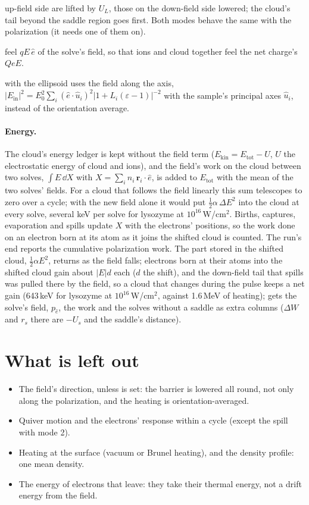 \begin{description}
    up-field side are lifted by $U_L$, those on the down-field side lowered; the cloud's tail beyond the saddle region
    goes first. Both  modes behave the same with the polarization (it needs one of them on).
  \item[The ions] feel $qE\,\hat e$ of the solve's field, so that ions and cloud together feel the net charge's
    $QeE$.
  \item[Heating] with the ellipsoid uses the field along the axis, $|E_{\mathrm{in}}|^2 = E_0^2\sum_i (\hat e\cdot\hat u_i)^2
    |1+L_i(\varepsilon-1)|^{-2}$ with the sample's principal axes $\hat u_i$, instead of the orientation average.
\end{description}

\paragraph{Energy.}
The cloud's energy ledger is kept without the field term ($E_{\mathrm{kin}} = E_{\mathrm{tot}} - U$, $U$ the
electrostatic energy of cloud and ions), and the field's work on the cloud between two solves,
$\int E\,\dd X$ with $X = \sum_i n_i\,\mathbf r_i\cdot\hat e$, is added to $E_{\mathrm{tot}}$ with the mean of the two
solves' fields. For a cloud that follows the field linearly this sum telescopes to zero over a cycle; with the new
field alone it would put $\frac12\alpha\,\Delta E^2$ into the cloud at every solve, several keV per solve for lysozyme at
$10^{16}$\,W/cm$^2$. Births, captures, evaporation and spills update $X$ with the electrons' positions, so the work
done on an electron born at its atom as it joins the shifted cloud is counted. The run's end reports the cumulative
polarization work. The part stored in the shifted cloud, $\frac12\alpha E^2$, returns as the field falls; electrons born at
their atoms into the shifted cloud gain about $|E|d$ each ($d$ the shift), and the down-field tail that spills was
pulled there by the field, so a cloud that changes during the pulse keeps a net gain (643\,keV for lysozyme at
$10^{16}$\,W/cm$^2$, against 1.6\,MeV of heating);  gets the solve's field,
$p_{\hat e}$, the work and the solves without a saddle as extra columns ($\Delta W$ and $r_s$ there are $-U_s$ and
the saddle's distance).

\section{What is left out}

\begin{itemize}
  \item The field's direction, unless  is set: the barrier is lowered all round, not
    only along the polarization, and the heating is orientation-averaged.
  \item Quiver motion and the electrons' response within a cycle (except the spill with mode 2).
  \item Heating at the surface (vacuum or Brunel heating), and the density profile: one mean density.
  \item The energy of electrons that leave: they take their thermal energy, not a drift energy from the field.
\end{itemize}
